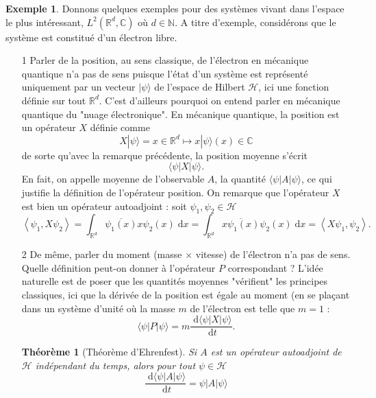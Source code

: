 \documentclass[12pt,openany,a4paper, titlepage]{article}
\newcommand{\la}{\left\langle}
\newcommand{\ra}{\right\rangle}
\newcommand{\dd}{\;\mathrm{d}}
\newcommand{\R}{\mathbb{R}}
\newcommand{\C}{\mathbb{C}}
\newcommand{\N}{\mathbb{N}}
\newcommand{\HH}{\mathcal{H}}
\newtheorem{theo}{Théorème}
\theoremstyle{definition}
\theoremstyle{definition}
\theoremstyle{definition}
\newtheorem{ex}{Exemple}
\theoremstyle{definition}
\theoremstyle{definition}
\theoremstyle{definition}
\begin{document}
\begin{ex} 
Donnons quelques exemples pour des systèmes vivant dans l'espace le plus intéressant, $L^2(\R^d,\C)$ où $d\in\N$. A titre d'exemple, considérons que le système est constitué d'un électron libre.
\begin{enumerate}
    \item[1] Parler de la position, au sens classique, de l'électron en mécanique quantique n'a pas de sens puisque l'état d'un système est représenté uniquement par un vecteur $|\psi\rangle$ de l'espace de Hilbert $\HH$, ici une fonction définie sur tout $\R^d$. C'est d'ailleurs pourquoi on entend parler en mécanique quantique du "nuage électronique". En mécanique quantique, la position est un opérateur $X$ définie comme $$X|\psi\rangle = x\in \R^d \mapsto x|\psi\rangle(x) \in \C$$ de sorte qu'avec la remarque précédente, la position moyenne s'écrit $$ \langle \psi | X | \psi \rangle.$$ En fait, on appelle moyenne de l'observable $A$, la quantité $\langle \psi | A | \psi \rangle$, ce qui justifie la définition de l'opérateur position. On remarque que l'opérateur $X$ est bien un opérateur autoadjoint : soit $\psi_1, \psi_2 \in \HH$
    \begin{equation}
        \la\psi_1, X\psi_2\ra =\int_{\R^d}\overline{\psi_1(x)}x\psi_2(x) \dd x
        = \int_{\R^d}\overline{x\psi_1(x)}\psi_2(x) \dd x 
        = \la X\psi_1, \psi_2\ra.
    \end{equation}
    \item[2] De même, parler du moment (masse $\times$ vitesse) de l'électron n'a pas de sens. Quelle définition peut-on donner à l'opérateur $P$ correspondant ? L'idée naturelle est de poser que les quantités moyennes "vérifient" les principes classiques, ici que la dérivée de la position est égale au moment (en se plaçant dans un système d'unité où la masse $m$ de l'électron est telle que $m=1$ :
    $$ \langle \psi |P|\psi\rangle = m\frac{\dd \langle \psi | X | \psi\rangle}{\dd t}.$$
    \begin{theo}[Théorème d'Ehrenfest]
        Si $A$ est un opérateur autoadjoint de $\HH$ indépendant du temps, alors pour tout $\psi\in\HH$
        \begin{equation}
            \frac{\dd \langle \psi | A | \psi\rangle}{\dd t} = \psi | A | \psi\rangle
        \end{equation}
    \end{theo}
\end{enumerate}
\end{ex}
\end{document}
